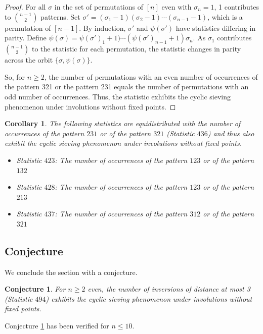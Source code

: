 \documentclass{amsart}
\newtheorem{cor}[thm]{Corollary}
\newtheorem{conj}[thm]{Conjecture}
\theoremstyle{definition}
\begin{document}
\begin{proof}
  For all $\sigma$ in the set of permutations of $[n]$ even with $\sigma_n = 1$, 1 contributes to $\binom{n-1}{2}$ patterns. Set $\sigma' =
    (\sigma_1-1)(\sigma_2 -1)\dotsm(\sigma_{n-1}-1)$, which is a permutation of $[n-1]$. By induction, $\sigma'$ and $\psi(\sigma')$ have statistics differing in parity. Define $\psi(\sigma) = \psi(\sigma')_1 + 1)\dotsm (\psi(\sigma')_{n-1} + 1)\sigma_n$. As $\sigma_1$ contributes $\binom{n-1}{2}$ to the statistic for each permutation, the statistic changes in parity across the orbit $\{\sigma, \psi(\sigma)\}$.

  So, for $n \geq 2$, the number of permutations with an even number of occurrences of the pattern 321 or the pattern 231 equals the number of permutations with an odd number of occurrences. Thus, the statistic exhibits the cyclic sieving phenomenon under involutions without fixed points.\end{proof}
  
  \begin{cor}\label{patterns}
  The following statistics are equidistributed with the number of occurrences of the pattern $231$ or of the pattern $321$ (Statistic $436$) and thus also exhibit the cyclic sieving phenomenon under involutions without fixed points.

  \begin{itemize}
    \item Statistic $423$: The number of occurrences of the pattern $123$ or of the pattern $132$
    \item Statistic $428$: The number of occurrences of the pattern $123$ or of the pattern $213$
    \item Statistic $437$: The number of occurrences of the pattern $312$ or of the pattern $321$
  \end{itemize}
\end{cor}


\subsection{Conjecture}

We conclude the section with a conjecture.

\begin{conj}\label{conj:inv_distance_3}
  For $n \geq 2$ even, the number of inversions of distance at most 3  (Statistic $494$) exhibits the cyclic sieving phenomenon under involutions without fixed points.
\end{conj}

Conjecture \ref{conj:inv_distance_3} has been verified for $n\leq 10$.
\end{document}
